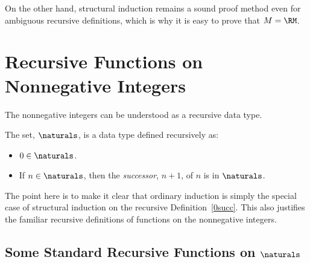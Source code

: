 On the other hand, structural induction remains a sound proof method even
for ambiguous recursive definitions, which is why it is easy to prove
that $M=\RM$.
\fi

\begin{problems}

\practiceproblems
{}

\classproblems
{}

\homeworkproblems
{}

\end{problems}


\section{Recursive Functions on Nonnegative Integers}

The nonnegative integers can be understood as a recursive data type.
\begin{definition}\label{0succ}
The set, $\naturals$, is a data type defined recursively as:
\begin{itemize}
\item $0 \in \naturals$.
\item If $n \in \naturals$, then the \emph{successor}, $n+1$, of $n$ is in
$\naturals$.
\end{itemize}

\end{definition}

The point here is to make it clear that ordinary induction is simply the
special case of structural induction on the recursive
Definition~\ref{0succ}.  This also justifies the familiar recursive
definitions of functions on the nonnegative integers.

\subsection{Some Standard Recursive Functions on $\naturals$}

